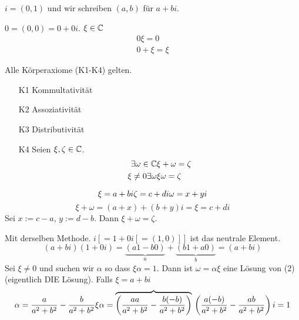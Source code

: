 \begin{Def}
  $i=(0,1)$ und wir schreiben $(a,b)$ für $a+bi$.
\end{Def}
\begin{Bem}
  $0=(0,0)=0+0i$. $\xi\in\mathbb{C}$
  \begin{align*}
    0\xi=0\\
    0+\xi=\xi
  \end{align*}
\end{Bem}
\begin{Sat}
  Alle Körperaxiome (K1-K4) gelten.
\end{Sat}
\begin{Bew}
  \begin{itemize}
    \item[K1] Kommultativität
    \item[K2] Assoziativität
    \item[K3] Distributivität
    \item[K4] Seien $\xi, \zeta \in\mathbb{C}$.
      \begin{align}
        \exists \omega\in\mathbb{C}&\xi+\omega=\zeta\\
        \xi\neq 0\exists \omega& \xi\omega=\zeta
      \end{align}
  \end{itemize}
\end{Bew}
\begin{Bew}
  \begin{equation*}
    \xi=a+bi\\
    \zeta=c+di\\
    \omega=x+yi
  \end{equation*}
  \begin{equation*}
    \xi+\omega = (a+x)+(b+y)i = \xi = c+di
  \end{equation*}
  Sei $x:=c-a$, $y:=d-b$. Dann $\xi+\omega=\zeta$.
\end{Bew}
\begin{Bew}
  Mit derselben Methode. $i \left[ = 1+0i \left[ =(1,0) \right] \right]$ ist das neutrale Element.
  \begin{equation*}
    (a+bi)(1+0i)=\underbrace{(a1-b0)}_{a}+\underbrace{(b1+a0)}_{b}=(a+bi)
  \end{equation*}
  Sei $\xi\neq 0$ und suchen wir $\alpha$ so dass $\xi\alpha=1$. Dann ist $\omega=\alpha\xi$ eine Lösung von (2) %
  (eigentlich DIE Lösung). Falls $\xi=a+bi$
  \begin{equation*}
    \alpha=\frac{a}{a^2+b^2}-\frac{b}{a^2+b^2}\\
    \xi\alpha=\overbrace{\left( \frac{aa}{a^2+b^2}-\frac{b(-b)}{a^2+b^2} \right)}\\
    \left( \frac{a(-b)}{a^2+b^2}-\frac{ab}{a^2+b^2} \right)i=1
  \end{equation*}
\end{Bew}

